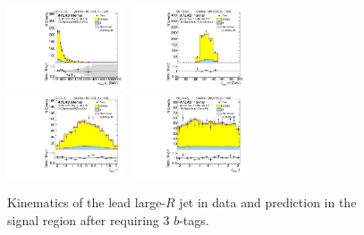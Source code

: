 \clearpage

\begin{figure}[htbp!]
\begin{center}
\includegraphics[width=0.31\textwidth,angle=-90]{figures/boosted/Signal/b77_ThreeTag_Signal_leadHCand_Pt_m.pdf}
\includegraphics[width=0.31\textwidth,angle=-90]{figures/boosted/Signal/b77_ThreeTag_Signal_leadHCand_Mass_s.pdf}\\
\includegraphics[width=0.31\textwidth,angle=-90]{figures/boosted/Signal/b77_ThreeTag_Signal_leadHCand_Eta.pdf}
\includegraphics[width=0.31\textwidth,angle=-90]{figures/boosted/Signal/b77_ThreeTag_Signal_leadHCand_Phi.pdf}
  \caption{Kinematics of the lead large-$R$ jet in data and prediction in the signal region after requiring 3 $b$-tags. }
  \label{fig:boosted-3b-signal-ak10-lead}
\end{center}
\end{figure}

